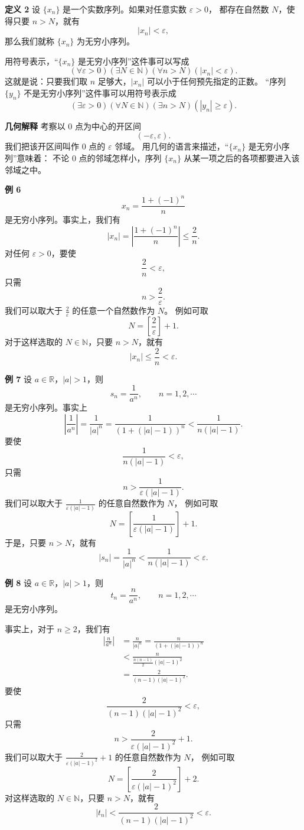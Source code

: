 \documentclass[12pt,a4paper,oneside]{ctexbook}
\begin{document}
\medskip
\textbf{定义 2}\quad
设 $\{x_n\}$ 是一个实数序列。如果对任意实数 $\varepsilon>0$，
都存在自然数 $N$，使得只要 $n>N$，就有
\[
    |x_n|<\varepsilon,
\]
那么我们就称 $\{x_n\}$ 为无穷小序列。

用符号表示，“$\{x_n\}$ 是无穷小序列”这件事可以写成
\[
    (\forall \varepsilon>0)(\exists N\in\mathbb{N})
    (\forall n>N)(|x_n|<\varepsilon).
\]
这就是说：只要我们取 $n$ 足够大，$|x_n|$ 可以小于任何预先指定的正数。
“序列 $\{y_n\}$ 不是无穷小序列”这件事可以用符号表示成
\[
    (\exists \varepsilon>0)(\forall N\in\mathbb{N})
    (\exists n>N)(|y_n|\ge \varepsilon).
\]

\medskip
\textbf{几何解释}\quad
考察以 $0$ 点为中心的开区间
\[
    (-\varepsilon,\varepsilon).
\]
我们把该开区间叫作 $0$ 点的 $\varepsilon$ 邻域。
用几何的语言来描述，“$\{x_n\}$ 是无穷小序列”意味着：
不论 $0$ 点的邻域怎样小，序列 $\{x_n\}$ 从某一项之后的各项都要进入该邻域之中。

\medskip
\textbf{例 6}\quad
\[
    x_n=\frac{1+(-1)^n}{n}
\]
是无穷小序列。事实上，我们有
\[
    |x_n|=\left|\frac{1+(-1)^n}{n}\right|\le \frac2n.
\]
对任何 $\varepsilon>0$，要使
\[
    \frac2n<\varepsilon,
\]
只需
\[
    n>\frac2\varepsilon.
\]
我们可以取大于 $\frac2\varepsilon$ 的任意一个自然数作为 $N$。
例如可取
\[
    N=\left[\frac2\varepsilon\right]+1.
\]
对于这样选取的 $N\in\mathbb{N}$，只要 $n>N$，就有
\[
    |x_n|\le \frac2n<\varepsilon.
\]

\medskip
\textbf{例 7}\quad
设 $a\in\mathbb{R}$，$|a|>1$，则
\[
    s_n=\frac{1}{a^n},\qquad n=1,2,\cdots
\]
是无穷小序列。事实上
\[
    \left|\frac{1}{a^n}\right|
    =\frac{1}{|a|^n}
    =\frac{1}{(1+(|a|-1))^n}
    <\frac{1}{n(|a|-1)}.
\]
要使
\[
    \frac{1}{n(|a|-1)}<\varepsilon,
\]
只需
\[
    n>\frac{1}{\varepsilon(|a|-1)}.
\]
我们可以取大于 $\frac{1}{\varepsilon(|a|-1)}$ 的任意自然数作为 $N$，
例如可取
\[
    N=\left[\frac{1}{\varepsilon(|a|-1)}\right]+1.
\]
于是，只要 $n>N$，就有
\[
    |s_n|=\frac{1}{|a|^n}
    <\frac{1}{n(|a|-1)}<\varepsilon.
\]

\medskip
\textbf{例 8}\quad
设 $a\in\mathbb{R}$，$|a|>1$，则
\[
    t_n=\frac{n}{a^n},\qquad n=1,2,\cdots
\]
是无穷小序列。

事实上，对于 $n\ge 2$，我们有
\begin{align*}
\left|\frac{n}{a^n}\right|
&=\frac{n}{|a|^n}
 =\frac{n}{(1+(|a|-1))^n}\\
&<\frac{n}{\frac{n(n-1)}{2}(|a|-1)^2}\\
&=\frac{2}{(n-1)(|a|-1)^2}.
\end{align*}
要使
\[
    \frac{2}{(n-1)(|a|-1)^2}<\varepsilon,
\]
只需
\[
    n>\frac{2}{\varepsilon(|a|-1)^2}+1.
\]
我们可以取大于 $\frac{2}{\varepsilon(|a|-1)^2}+1$ 的任意自然数作为 $N$，
例如可取
\[
    N=\left[\frac{2}{\varepsilon(|a|-1)^2}\right]+2.
\]
对这样选取的 $N\in\mathbb{N}$，只要 $n>N$，就有
\[
    |t_n|<\frac{2}{(n-1)(|a|-1)^2}<\varepsilon.
\]
\end{document}
